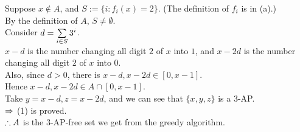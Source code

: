 \begin{pr}
\begin{enumerate}[(a)]
Suppose $x\notin A$, and $S:=\{i:f_i(x)=2\}$. (The definition of $f_i$ is in (a).)\\
By the definition of $A$, $S\neq\emptyset$.\\
Consider $d=\sum\limits_{i\in S}3^i$.\\
$x-d$ is the number changing all digit $2$ of $x$ into $1$, and $x-2d$ is the number changing all digit $2$ of $x$ into $0$.\\
Also, since $d>0$, there is $x-d, x-2d\in[0, x-1]$.\\
Hence $x-d, x-2d\in A\cap[0, x-1]$.\\
Take $y=x-d, z=x-2d$, and we can see that $\{x, y, z\}$ is a $3$-AP.\\
$\Rightarrow$ (1) is proved.\\
$\therefore A$ is the $3$-AP-free set we get from the greedy algorithm.
\end{enumerate}
\end{pr}
